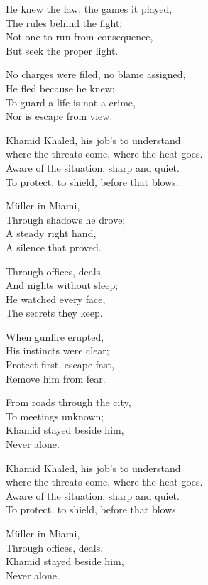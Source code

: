 \begin{lyrics}
He knew the law, the games it played,\\
The rules behind the fight;\\
Not one to run from consequence,\\
But seek the proper light.

No charges were filed, no blame assigned,\\
He fled because he knew;\\
To guard a life is not a crime,\\
Nor is escape from view.

Khamid Khaled, his job's to understand\\
where the threats come, where the heat goes.\\
Aware of the situation, sharp and quiet.\\
To protect, to shield, before that blows.

Müller in Miami,\\
Through shadows he drove;\\
A steady right hand,\\
A silence that proved.

Through offices, deals,\\
And nights without sleep;\\
He watched every face,\\
The secrets they keep.

When gunfire erupted,\\
His instincts were clear;\\
Protect first, escape fast,\\
Remove him from fear.

From roads through the city,\\
To meetings unknown;\\
Khamid stayed beside him,\\
Never alone.

Khamid Khaled, his job's to understand\\
where the threats come, where the heat goes.\\
Aware of the situation, sharp and quiet.\\
To protect, to shield, before that blows.

Müller in Miami,\\
Through offices, deals,\\
Khamid stayed beside him,\\
Never alone.
\end{lyrics}

